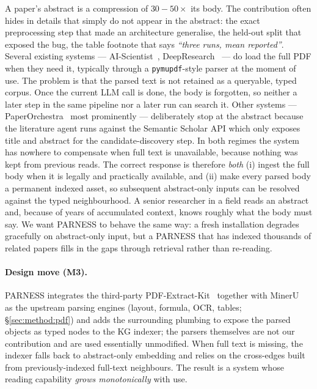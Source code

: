 \documentclass{article}
\newcommand{\parness}{\textsf{PARNESS}}
\newcommand{\code}[1]{\texttt{\small #1}}
\begin{document}
A paper's abstract is a compression of $30{-}50\times$ its body. The
contribution often hides in details that simply do not appear in the
abstract: the exact preprocessing step that made an architecture
generalise, the held-out split that exposed the bug, the table footnote
that says \emph{``three runs, mean reported''}. Several existing
systems --- AI-Scientist~\cite{aisciv1,aisciv2}, DeepResearch~\cite{deepresearch}
--- do load the full PDF when they need it, typically through a
\code{pymupdf}-style parser at the moment of use. The problem is that
the parsed text is not retained as a queryable, typed corpus. Once the
current LLM call is done, the body is forgotten, so neither a later
step in the same pipeline nor a later run can search it. Other systems
--- PaperOrchestra~\cite{paperorchestra} most prominently --- deliberately
stop at the abstract because the literature agent runs against the
Semantic Scholar API which only exposes title and abstract for the
candidate-discovery step. In both regimes the system has nowhere to
compensate when full text is unavailable, because nothing was kept from
previous reads. The correct response is therefore \emph{both} (i) ingest
the full body when it is legally and practically available, and
(ii) make every parsed body a permanent indexed asset, so subsequent
abstract-only inputs can be resolved against the typed neighbourhood.
A senior researcher in a field reads an abstract and, because of years
of accumulated context, knows roughly what the body must say. We want
\parness{} to behave the same way: a fresh installation degrades
gracefully on abstract-only input, but a \parness{} that has indexed
thousands of related papers fills in the gaps through retrieval rather
than re-reading.

\paragraph{Design move (M3).} \parness{} integrates the third-party
PDF-Extract-Kit~\cite{pdfextractkit} together with MinerU~\cite{mineru}
as the upstream parsing engines (layout, formula, OCR, tables;
\S\ref{sec:method:pdf}) and adds the surrounding plumbing to expose
the parsed objects as typed nodes to the KG indexer; the parsers
themselves are not our contribution and are used essentially
unmodified. When full text is missing, the indexer falls back to
abstract-only embedding and relies on the cross-edges built from
previously-indexed full-text neighbours. The result is a system whose
reading capability \emph{grows monotonically} with use.
\end{document}
